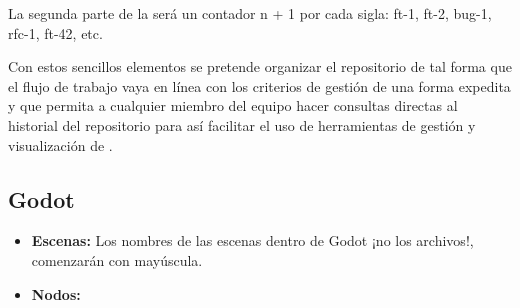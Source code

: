 La segunda parte de la  será un contador {n + 1} por cada sigla: ft-1, ft-2, bug-1, rfc-1, ft-42, etc.


Con estos sencillos elementos se pretende organizar el repositorio de tal forma que el flujo de trabajo vaya en línea con los criterios de gestión de una forma expedita y que permita a cualquier miembro del equipo hacer consultas directas al historial del repositorio para así facilitar el uso de herramientas de gestión y visualización de .


\subsection{Godot}

\begin{itemize}
\item \textbf{Escenas:} Los nombres de las escenas dentro de Godot ¡no los archivos!, comenzarán con mayúscula.

\item \textbf{Nodos:} 
\end{itemize}